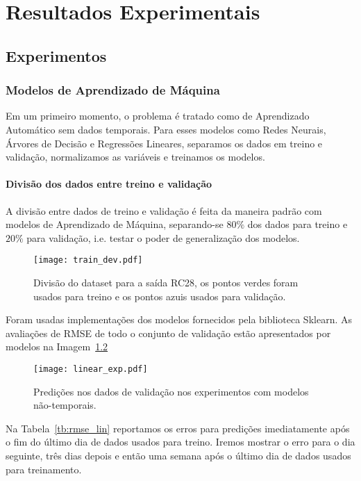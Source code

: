 \chapter{ Resultados Experimentais }
\label{cap:resultados}
\section{Experimentos}



\subsection{Modelos de Aprendizado de Máquina}


Em um primeiro momento, o problema é tratado como de Aprendizado Automático sem
dados temporais. Para esses modelos como Redes Neurais, Árvores de Decisão e Regressões
Lineares, separamos os dados em treino e validação, normalizamos as variáveis e
treinamos os modelos. 

\subsubsection{Divisão dos dados entre treino e validação}


A divisão entre dados de treino e validação é feita da maneira padrão com
modelos de Aprendizado de Máquina, separando-se $80\%$ dos dados para treino e
$20\%$ para validação, i.e. testar o poder de generalização dos modelos. 

\begin{figure}[H]
  \centering
  \texttt{[image: train\_dev.pdf]}
  \caption{Divisão do dataset para a saída RC28, os pontos verdes foram usados para
    treino e os pontos azuis usados para validação.}
  \label{fig:divrc28}
\end{figure}

Foram usadas implementações dos modelos fornecidos pela biblioteca Sklearn.
As avaliações de RMSE de todo o conjunto de validação estão apresentados por modelos na Imagem~\ref{fig:linmodels}  

\begin{figure}[H]
  \centering
\texttt{[image: linear\_exp.pdf]}
\caption{Predições nos dados de validação nos experimentos com modelos não-temporais. }
\label{fig:linmodels}
\end{figure}

Na Tabela~\ref{tb:rmse_lin} reportamos os erros para predições imediatamente
após o fim do último dia de dados usados para treino. Iremos mostrar o
erro para o dia seguinte, três dias depois e então uma semana após o último dia
de dados usados para treinamento.

